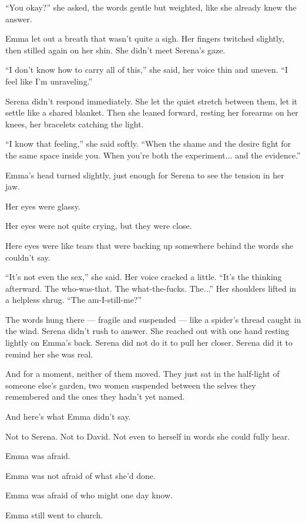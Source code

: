 ``You okay?'' she asked, the words gentle but weighted, like she already knew the answer.

Emma let out a breath that wasn’t quite a sigh. Her fingers twitched slightly, then stilled again on her 
shin. She didn’t meet Serena’s gaze.

``I don’t know how to carry all of this,'' she said, her voice thin and uneven. ``I feel like I’m unraveling.''

Serena didn’t respond immediately. She let the quiet stretch between them, let it settle like a shared 
blanket. Then she leaned forward, resting her forearms on her knees, her bracelets catching the light.

``I know that feeling,'' she said softly. ``When the shame and the desire fight for the same space inside 
you. When you’re both the experiment... and the evidence.''

Emma’s head turned slightly, just enough for Serena to see the tension in her jaw. 

Her eyes were glassy. 

Her eyes were not quite crying, but they were close. 

Here eyes were like tears that were backing up somewhere behind the words she couldn’t 
say. 

``It’s not even the sex,'' she said. Her voice cracked a little. ``It’s the thinking afterward. The 
who-was-that. The what-the-fucks. The...'' Her shoulders lifted in a helpless shrug. ``The am-I-still-me?''

The words hung there --- fragile and suspended --- like a spider’s thread caught in the wind. Serena didn’t 
rush to answer. She reached out with one hand resting lightly on Emma’s back. Serena did not do it 
to pull her closer. Serena did it to remind her she was real.

And for a moment, neither of them moved. They just sat in the half-light of someone else’s garden, 
two women suspended between the selves they remembered and the ones they hadn’t yet named.

And here’s what Emma didn’t say.

Not to Serena.
Not to David.
Not even to herself in words she could fully hear.

Emma was afraid. 

Emma was not afraid of what she’d done.

Emma was afraid of who might one day know.

Emma still went to church.

